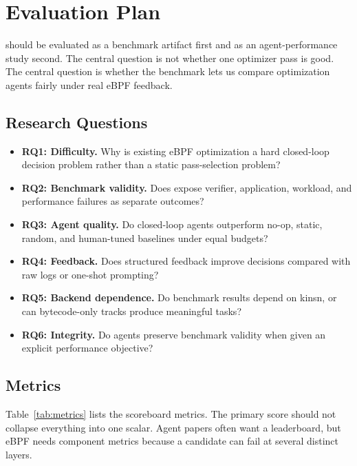 \section{Evaluation Plan}
\label{sec:evaluation}

\sys should be evaluated as a benchmark artifact first and as an agent-performance study second. The central question is not whether one optimizer pass is good. The central question is whether the benchmark lets us compare optimization agents fairly under real eBPF feedback.

\subsection{Research Questions}

\begin{itemize}
  \item \textbf{RQ1: Difficulty.} Why is existing eBPF optimization a hard closed-loop decision problem rather than a static pass-selection problem?
  \item \textbf{RQ2: Benchmark validity.} Does \sys expose verifier, application, workload, and performance failures as separate outcomes?
  \item \textbf{RQ3: Agent quality.} Do closed-loop agents outperform no-op, static, random, and human-tuned baselines under equal budgets?
  \item \textbf{RQ4: Feedback.} Does structured feedback improve decisions compared with raw logs or one-shot prompting?
  \item \textbf{RQ5: Backend dependence.} Do benchmark results depend on kinsn, or can bytecode-only tracks produce meaningful tasks?
  \item \textbf{RQ6: Integrity.} Do agents preserve benchmark validity when given an explicit performance objective?
\end{itemize}

\subsection{Metrics}

Table~\ref{tab:metrics} lists the scoreboard metrics. The primary score should not collapse everything into one scalar. Agent papers often want a leaderboard, but eBPF needs component metrics because a candidate can fail at several distinct layers.

